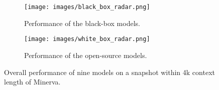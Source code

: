 \begin{figure*}[t!]
    \centering
    \begin{subfigure}[t]{0.45\textwidth}
        \texttt{[image: images/black\_box\_radar.png]}
        \caption{Performance of the black-box models.}
        \label{fig:first}
    \end{subfigure}
    \begin{subfigure}[t]{0.45\textwidth}
        \texttt{[image: images/white\_box\_radar.png]}
        \caption{Performance of the open-source models.}
        \label{fig:second}
    \end{subfigure}
    \caption{Overall performance of nine models on a snapshot within 4k context length of Minerva.}
    \label{fig:radar}

\end{figure*}